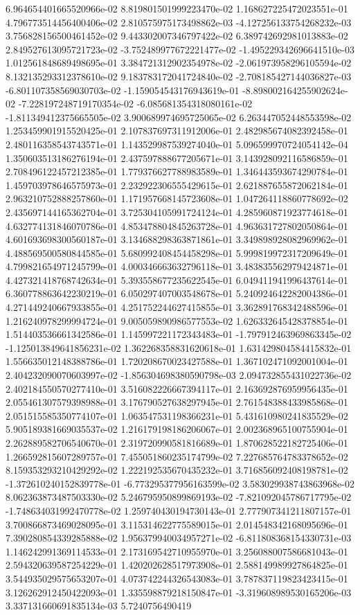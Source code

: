 	6.964654401665520966e-02	8.819801501999223470e-02	1.168627225472023551e-01	4.796773514456400406e-02	2.810575975173498862e-03	-4.127256133754268232e-03	3.756828156500461452e-02	9.443302007346797422e-02	6.389742692981013883e-02	2.849527613095721723e-02	-3.752489977672221477e-02	-1.495229342696641510e-03	1.012561848689498695e-01	3.384721312902354978e-02	-2.061973958296105594e-02	8.132135293312378610e-02	9.183783172041724840e-02	-2.708185427144036827e-03	-6.801107358569030703e-02	-1.159054543176943619e-01	-8.898002164255902624e-02	-7.228197248719170354e-02	-6.085681354318080161e-02	-1.811349412375665505e-02	3.900689974695725065e-02	6.263447052448553598e-02	1.253459901915520425e-01	2.107837697311912006e-01	2.482985674082392458e-01	2.480116358543743571e-01	1.143529987539274040e-01	5.096599970724054142e-04	1.350603513186276194e-01	2.437597888677205671e-01	3.143928092116586859e-01	2.708496122457212385e-01	1.779376627788983589e-01	1.346443593674290784e-01	1.459703978646575973e-01	2.232922306555429615e-01	2.621887655872062184e-01	2.963210752888257860e-01	1.171957668145723608e-01	1.047264118860778692e-02	2.435697144165362704e-01	3.725304105991724124e-01	4.285960871923774618e-01	4.632774131846070786e-01	4.853478804845263728e-01	4.963631727802050864e-01	4.601693698300560187e-01	3.134688298363871861e-01	3.349898928082969962e-01	4.488569500580844585e-01	5.680992408454458298e-01	5.999819972317209649e-01	4.799821654971245799e-01	4.000346663632796118e-01	3.483835562979424871e-01	4.427321418768742634e-01	5.393558677235622545e-01	6.049411941996437614e-01	6.360778863642230219e-01	6.050297407003548678e-01	5.240924642282004386e-01	4.271449240667933855e-01	4.251752244627415855e-01	3.362891768342488596e-01	1.216240978299994724e-01	9.005059890986577553e-02	1.626332645428378854e-01	1.514403536661342586e-01	1.145997221172343483e-01	-1.797912463969863345e-02	-1.125013849641856231e-02	1.362268358831620618e-01	1.631429804584415832e-01	1.556635012148388786e-01	1.720208670023427588e-01	1.367102471092001004e-01	2.404232090070603997e-02	-1.856304698380590798e-03	2.094732855431022736e-02	2.402184550570277410e-01	3.516082226667394117e-01	2.163692876959956435e-01	2.055461307579398988e-01	3.176790527638297945e-01	2.761548388433985868e-01	2.051515585350774107e-01	1.063547531198366231e-01	5.431610980241835529e-02	5.905189381669035537e-02	1.216179198186206067e-01	2.002368965100755904e-01	2.262889582706540670e-01	2.319720990581816689e-01	1.870628522182725406e-01	1.266592815607289757e-01	7.455051860235174799e-02	7.227685764783378652e-02	8.159353293210429292e-02	1.222192535670435232e-01	3.716856092408198781e-02	-1.372610240152839778e-01	-6.773295377956163599e-02	3.583029938743863968e-02	8.062363873487503330e-02	5.246795950899869193e-02	-7.821092045786717795e-02	-1.748634031992470778e-02	1.259740430194730143e-01	2.777907341211807157e-01	3.700866873469028095e-01	3.115314622775589015e-01	2.014548342168095696e-01	7.390280854339285888e-02	1.956379940034957271e-02	-6.811808368154330731e-03	1.146242991369114533e-01	2.173169542710955970e-01	3.256088007586681043e-01	2.594320639587254229e-01	1.420202628517973908e-01	2.588149989927864825e-01	3.544935029575653207e-01	4.073742244326543083e-01	3.787837119823423415e-01	3.126262912450422093e-01	1.335598879218150847e-01	-3.319608989530165206e-03	3.337131660691835134e-03	5.7240756490419